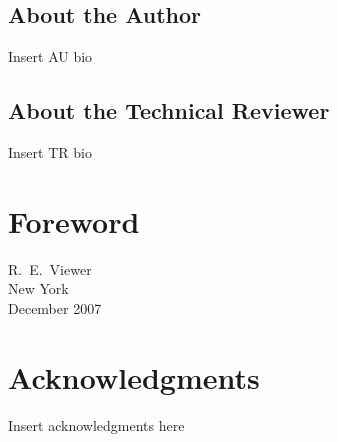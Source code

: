 \newpage\null\thispagestyle{empty}\newpage

\null\vskip1.175in
\thispagestyle{empty}
\section*{About the Author}
Insert AU bio

\section*{About the Technical Reviewer}
Insert TR bio

\newpage\null\thispagestyle{empty}\newpage

\brieftableofcontents

\tableofcontents


\chapter*[Foreword]{Foreword}
\turnoffbigpara

\lipsum[48-60]

\bigskip

\begin{raggedleft}
R.~E.~Viewer\\
New York\\
December 2007\\
\end{raggedleft}

\chapter*{Acknowledgments}
\turnoffbigpara

Insert acknowledgments here